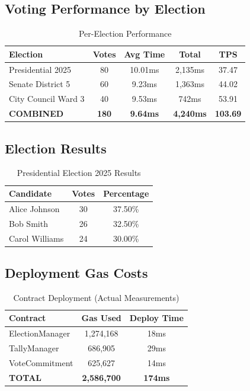 \documentclass[conference]{IEEEtran}
\begin{document}
\subsection{Voting Performance by Election}

\begin{table}[htbp]
\caption{Per-Election Performance}
\centering
\footnotesize
\begin{tabular}{|l|c|c|c|c|}
\hline
\textbf{Election} & \textbf{Votes} & \textbf{Avg Time} & \textbf{Total} & \textbf{TPS} \\
\hline
Presidential 2025 & 80 & 10.01ms & 2,135ms & 37.47 \\
\hline
Senate District 5 & 60 & 9.23ms & 1,363ms & 44.02 \\
\hline
City Council Ward 3 & 40 & 9.53ms & 742ms & 53.91 \\
\hline
\textbf{COMBINED} & \textbf{180} & \textbf{9.64ms} & \textbf{4,240ms} & \textbf{103.69} \\
\hline
\end{tabular}
\end{table}

\subsection{Election Results}

\begin{table}[htbp]
\caption{Presidential Election 2025 Results}
\centering
\begin{tabular}{|l|c|c|}
\hline
\textbf{Candidate} & \textbf{Votes} & \textbf{Percentage} \\
\hline
Alice Johnson & 30 & 37.50\% \\
\hline
Bob Smith & 26 & 32.50\% \\
\hline
Carol Williams & 24 & 30.00\% \\
\hline
\end{tabular}
\end{table}

\subsection{Deployment Gas Costs}

\begin{table}[htbp]
\caption{Contract Deployment (Actual Measurements)}
\centering
\begin{tabular}{|l|c|c|}
\hline
\textbf{Contract} & \textbf{Gas Used} & \textbf{Deploy Time} \\
\hline
ElectionManager & 1,274,168 & 18ms \\
\hline
TallyManager & 686,905 & 29ms \\
\hline
VoteCommitment & 625,627 & 14ms \\
\hline
\textbf{TOTAL} & \textbf{2,586,700} & \textbf{174ms} \\
\hline
\end{tabular}
\end{table}
\end{document}
